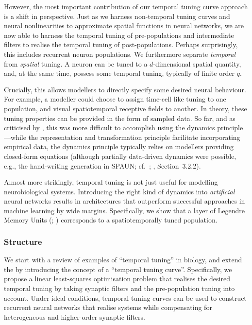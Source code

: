 However, the most important contribution of our temporal tuning curve approach is a shift in perspective.
Just as we harness non-temporal tuning curves and neural nonlinearities to approximate spatial functions in neural networks, we are now able to harness the temporal tuning of pre-populations and intermediate filters to realise the temporal tuning of post-populations.
Perhaps surprisingly, this includes recurrent neuron populations.
We furthermore separate \emph{temporal} from \emph{spatial} tuning.
A neuron can be tuned to a $d$-dimensional spatial quantity, and, at the same time, possess some temporal tuning, typically of finite order $q$.

Crucially, this allows modellers to directly specify some desired neural behaviour.
For example, a modeller could choose to assign time-cell like tuning \citep{pastalkova2008internally,tiganj2016sequential} to one population, and visual spatiotemporal receptive fields \citep{carandini1999linearity} to another.
In theory, these tuning properties can be provided in the form of sampled data.
So far, and as criticised by \citet{nicola2017supervised}, this was more difficult to accomplish using the \NEF dynamics principle---while the representation and transformation principle facilitate incorporating empirical data, the dynamics principle typically relies on modellers providing closed-form equations (although partially data-driven dynamics were possible, e.g., the hand-writing generation in SPAUN; cf.~\cite{eliasmith2012largescale}; \cite{choo2018spaun}, Section~3.2.2).

Almost more strikingly, temporal tuning is not just useful for modelling neurobiological systems.
Introducing the right kind of dynamics into \emph{artificial} neural networks results in architectures that outperform successful approaches in machine learning by wide margins.
Specifically, we show that a layer of Legendre Memory Units (\LMUpl; \cite{voelker2019lmu}) corresponds to a spatiotemporally tuned \NEF population.

\subsubsection{Structure}
We start  with a review of examples of \enquote{temporal tuning} in biology, and extend the \NEF by introducing the concept of a \enquote{temporal tuning curve}.
Specifically, we propose a linear least-squares optimisation problem that realises the desired temporal tuning by taking synaptic filters and the pre-population tuning into account.
Under ideal conditions, temporal tuning curves can be used to construct recurrent neural networks that realise \LTI systems while compensating for heterogeneous and higher-order synaptic filters.

